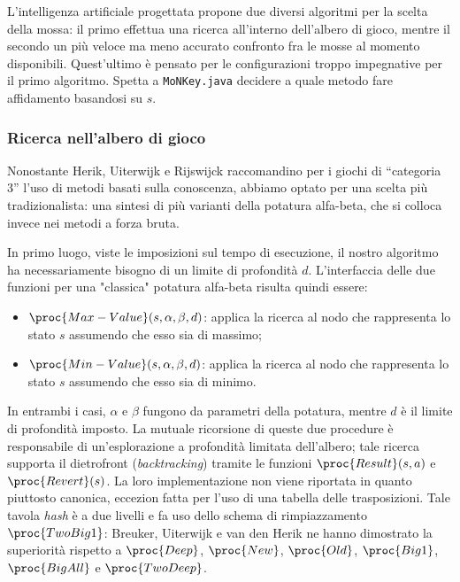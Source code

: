 \documentclass{article}
\begin{document}
L'intelligenza artificiale progettata propone due diversi algoritmi per la
scelta della mossa: il primo effettua una ricerca all'interno dell'albero di
gioco, mentre il secondo un più veloce ma meno accurato confronto fra le mosse
al momento disponibili. Quest'ultimo è pensato per le configurazioni troppo
impegnative per il primo algoritmo. Spetta a \verb!MoNKey.java! decidere a quale
metodo fare affidamento basandosi su $s$.

\subsubsection{Ricerca nell'albero di gioco}

Nonostante Herik, Uiterwijk e Rijswijck \cite{VANDENHERIK2002277} raccomandino
per i giochi di ``categoria 3'' l'uso di metodi basati sulla conoscenza,
abbiamo optato per una scelta più tradizionalista: una sintesi di più varianti
della potatura alfa-beta, che si colloca invece nei metodi a forza bruta.

In primo luogo, viste le imposizioni sul tempo di esecuzione, il nostro
algoritmo ha necessariamente bisogno di un limite di profondità $d$.
L'interfaccia delle due funzioni per una "classica" potatura alfa-beta
\cite{at.UBO029034619980101} risulta quindi essere:
\begin{itemize}
  \item $\proc{Max-Value}(s, \alpha, \beta, d)$: applica la ricerca
    al nodo che rappresenta lo stato $s$ assumendo che esso sia di massimo;
  \item $\proc{Min-Value}(s, \alpha, \beta, d)$: applica la ricerca
    al nodo che rappresenta lo stato $s$ assumendo che esso sia di minimo.
\end{itemize}
In entrambi i casi, $\alpha$ e $\beta$ fungono da parametri della potatura,
mentre $d$ è il limite di profondità imposto. La mutuale ricorsione di queste
due procedure è responsabile di un'esplorazione a profondità limitata
dell'albero; tale ricerca supporta il dietrofront (\emph{backtracking}) tramite
le funzioni $\proc{Result}(s, a)$ e $\proc{Revert}(s)$. La loro
implementazione non viene riportata in quanto piuttosto canonica, eccezion fatta
per l'uso di una tabella delle trasposizioni. Tale tavola \emph{hash} è a due
livelli e fa uso dello schema di rimpiazzamento $\proc{TwoBig1}$: Breuker,
Uiterwijk e van den Herik \cite{BREUKER-UITERWIJK-VANDENHERIK}
\cite{edsdbl.journals.icga.BreukerUH9619960101} ne hanno dimostrato la
superiorità rispetto a $\proc{Deep}$, $\proc{New}$, $\proc{Old}$, $\proc{Big1}$,
$\proc{BigAll}$ e $\proc{TwoDeep}$.
\end{document}
